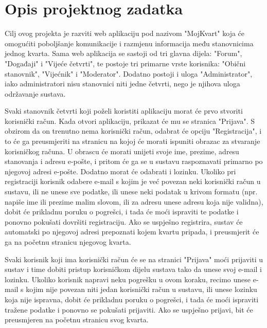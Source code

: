 \chapter{Opis projektnog zadatka}
		
	Cilj ovog projekta je razviti web aplikaciju pod nazivom "MojKvart" koja će omogućiti poboljšanje komunikacije i razmjenu informacija među stanovnicima jednog kvarta. Sama web aplikacija se sastoji od tri glavna dijela: "Forum", "Događaji" i "Vijeće četvrti", te postoje tri primarne vrste korisnika: "Obični stanovnik", "Vijećnik" i "Moderator". Dodatno postoji i uloga "Administrator", iako administratori nisu stanovnici niti jedne četvrti, nego je njihova uloga održavanje sustava.
	
	Svaki stanovnik četvrti koji poželi koristiti aplikaciju morat će prvo stvoriti korisnički račun. Kada otvori aplikaciju, prikazat će mu se stranica "Prijava". S obzirom da on trenutno nema korisnički račun, odabrat će opciju "Registracija", i to će ga preusmjeriti na stranicu na kojoj će morati ispuniti obrazac za stvaranje korisničkog računa. U obrascu će morati unijeti svoje ime, prezime, adresu stanovanja i adresu e-pošte, i pritom će ga se u sustavu raspoznavati primarno po njegovoj adresi e-pošte. Dodatno morat će odabrati i lozinku. Ukoliko pri registraciji korisnik odabere e-mail s kojim je već povezan neki korisnički račun u sustavu, ili ne unese sve podatke, ili unese neki podatak u krivom formatu (npr. napiše ime ili prezime malim slovom, ili za adresu unese adresu koja nije validna), dobit će prikladnu poruku o pogrešci, i tada će moći ispraviti te podatke i ponovno pokušati dovršiti registraciju. Ako se uspješno registrira, sustav će automatski po njegovoj adresi prepoznati kojem kvartu pripada, i preusmjerit će ga na početnu stranicu njegovog kvarta.
	
	Svaki korisnik koji ima korisnički račun će se na stranici "Prijava" moći prijaviti u sustav i time dobiti pristup korisničkom dijelu sustava tako da unese svoj e-mail i lozinku. Ukoliko korisnik napravi neku pogrešku u ovom koraku, recimo unese e-mail s kojim nije povezan niti jedan korisnički račun u sustavu, ili unese lozinku koja nije ispravna, dobit će prikladnu poruku o pogrešci, i tada će moći ispraviti tražene podatke i ponovno se pokušati prijaviti. Ako se uspješno prijavi, bit će preusmjeren na početnu stranicu svog kvarta.
	
